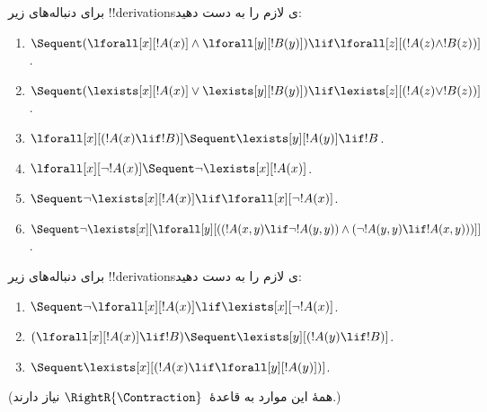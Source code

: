 \documentclass[../../../include/open-logic-section]{subfiles}
\begin{document}
\begin{prob}
برای دنباله‌های زیر !!{derivation}sی لازم را به دست دهید:
\begin{enumerate}
\item $\Sequent (\lforall[x][!A(x)] \land \lforall[y][!B(y)]) \lif
\lforall[z][(!A(z) \land !B(z))]$.
\item $\Sequent (\lexists[x][!A(x)] \lor \lexists[y][!B(y)]) \lif
\lexists[z][(!A(z) \lor !B(z))]$.
\item $\lforall[x][(!A(x) \lif !B)] \Sequent \lexists[y][!A(y)] \lif !B$.
\item $\lforall[x][\lnot !A(x)] \Sequent \lnot\lexists[x][!A(x)]$.
\item $\Sequent \lnot\lexists[x][!A(x)] \lif \lforall[x][\lnot !A(x)]$.
\item $\Sequent \lnot\lexists[x][\lforall[y][((!A(x,y) \lif \lnot
!A(y,y)) \land (\lnot !A(y,y) \lif !A(x,y)))]]$.
\end{enumerate}
\end{prob}

\begin{prob}
برای دنباله‌های زیر !!{derivation}sی لازم را به دست دهید:
\begin{enumerate}
\item $\Sequent \lnot\lforall[x][!A(x)] \lif \lexists[x][\lnot!A(x)]$.
\item $(\lforall[x][!A(x)] \lif !B) \Sequent \lexists[y][(!A(y) \lif !B)]$.
\item $\Sequent \lexists[x][(!A(x) \lif \lforall[y][!A(y)])]$.
\end{enumerate}
(همهٔ این موارد به قاعدهٔ~$\RightR{\Contraction}$ نیاز دارند.)
\end{prob}
\end{document}
